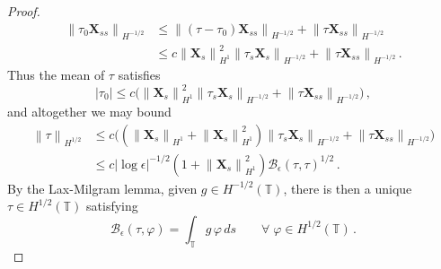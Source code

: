 \documentclass[11pt,reqno]{amsart}
\newcommand{\T}{\mathbb{T}}
\newcommand{\X}{\bm{X}}
\newcommand{\abs}[1]{\left\lvert #1 \right\rvert}
\newcommand{\norm}[1]{\left\lVert #1 \right\rVert}
\newcommand{\mc}[1]{\mathcal{#1}}
\numberwithin{equation}{section}
\theoremstyle{definition}
\begin{document}
\begin{proof}
\begin{equation}
\begin{aligned}
  \norm{\tau_0\X_{ss}}_{H^{-1/2}} &\le \norm{(\tau-\tau_0)\X_{ss}}_{H^{-1/2}}+\norm{\tau\X_{ss}}_{H^{-1/2}}\\
  &\le  c\norm{\X_s}_{H^1}^2\norm{\tau_s\X_s}_{H^{-1/2}}+\norm{\tau\X_{ss}}_{H^{-1/2}}\,.
\end{aligned}
\end{equation}
%
%
Thus the mean of $\tau$ satisfies
\begin{equation}
  \abs{\tau_0}\le c\big(\norm{\X_s}_{H^1}^2\norm{\tau_s\X_s}_{H^{-1/2}}+\norm{\tau\X_{ss}}_{H^{-1/2}}\big)\,,
\end{equation}
and altogether we may bound 
\begin{equation}\label{eq:tau_Hhalf}
\begin{aligned}
  \norm{\tau}_{H^{1/2}}&\le 
  c\big((\norm{\X_s}_{H^1}+\norm{\X_s}_{H^1}^2)\norm{\tau_s\X_s}_{H^{-1/2}}+\norm{\tau\X_{ss}}_{H^{-1/2}}\big) \\
  &\le c\abs{\log\epsilon}^{-1/2}(1+\norm{\X_s}_{H^1}^2)\mc{B}_\epsilon(\tau,\tau)^{1/2}\,.
\end{aligned}
\end{equation}
%
%
By the Lax-Milgram lemma, given $g\in H^{-1/2}(\T)$, there is then a unique $\tau\in H^{1/2}(\T)$ satisfying 
\begin{equation}
  \mc{B}_\epsilon(\tau,\varphi) = \int_\T g\,\varphi\,ds \qquad \forall\;\varphi\in H^{1/2}(\T)\,.
\end{equation}



\end{proof}
\end{document}
